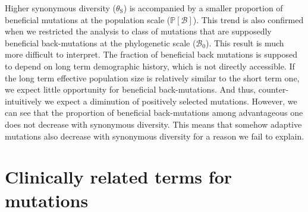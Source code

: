 \documentclass{article}
\newcommand{\proba}{\mathbb{P}}
\newcommand{\SphyBen}{\mathcal{B}_0}
\newcommand{\SpopBen}{\mathcal{B}}
\newcommand{\thetaSyn}{\theta_{\text{S}}}
\begin{document}
    Higher synonymous diversity ($\thetaSyn$) is accompanied by a smaller proportion of beneficial mutations at the population scale ($\proba [ \SpopBen ]$).
    This trend is also confirmed when we restricted the analysis to class of mutations that are supposedly beneficial back-mutations at the phylogenetic scale ($\SphyBen$).
    This result is much more difficult to interpret.
    The fraction of beneficial back mutations is supposed to depend on long term demographic history, which is not directly accessible.
    If the long term effective population size is relatively similar to the short term one, we expect little opportunity for beneficial back-mutations.
    And thus, counter-intuitively we expect a diminution of positively selected mutations.
    However, we can see that the proportion of beneficial back-mutations among advantageous one does not decrease with synonymous diversity.
    This means that somehow adaptive mutations also decrease with synonymous diversity for a reason we fail to explain.

    \newpage

    \section{Clinically related terms for mutations}
\end{document}
